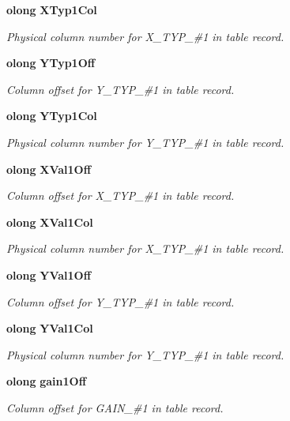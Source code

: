 \begin{CompactItemize}
{\bf olong} {\bf XTyp1Col}
\begin{CompactList}\small\item\em Physical column number for X\_\-TYP\_\-\#1 in table record. \item\end{CompactList}\item 
{\bf olong} {\bf YTyp1Off}
\begin{CompactList}\small\item\em Column offset for Y\_\-TYP\_\-\#1 in table record. \item\end{CompactList}\item 
{\bf olong} {\bf YTyp1Col}
\begin{CompactList}\small\item\em Physical column number for Y\_\-TYP\_\-\#1 in table record. \item\end{CompactList}\item 
{\bf olong} {\bf XVal1Off}
\begin{CompactList}\small\item\em Column offset for X\_\-TYP\_\-\#1 in table record. \item\end{CompactList}\item 
{\bf olong} {\bf XVal1Col}
\begin{CompactList}\small\item\em Physical column number for X\_\-TYP\_\-\#1 in table record. \item\end{CompactList}\item 
{\bf olong} {\bf YVal1Off}
\begin{CompactList}\small\item\em Column offset for Y\_\-TYP\_\-\#1 in table record. \item\end{CompactList}\item 
{\bf olong} {\bf YVal1Col}
\begin{CompactList}\small\item\em Physical column number for Y\_\-TYP\_\-\#1 in table record. \item\end{CompactList}\item 
{\bf olong} {\bf gain1Off}
\begin{CompactList}\small\item\em Column offset for GAIN\_\-\#1 in table record. \item\end{CompactList}\item 

\end{CompactItemize}
